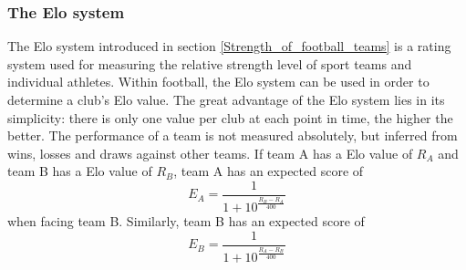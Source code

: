 \subsubsection{The Elo system}

The Elo system introduced in section \ref{Strength_of_football_teams} is a rating system used for measuring the relative strength level of sport teams and individual athletes. Within football, the Elo system can be used in order to determine a club's Elo value. The great advantage of the Elo system lies in its simplicity: there is only one value per club at each point in time, the higher the better. 
\newpar
The performance of a team is not measured absolutely, but inferred from wins, losses and draws against other teams. If team A has a Elo value of $R_A$ and team B has a Elo value of $R_B$, team A has an expected score of 
\begin{equation}\label{eq5.2}
    E_A = \frac{1}{1+10^{\frac{R_B - R_A}{400}}}
\end{equation}
when facing team B. Similarly, team B has an expected score of
\begin{equation}\label{eq5.3}
    E_B = \frac{1}{1+10^{\frac{R_A - R_B}{400}}}
\end{equation}

